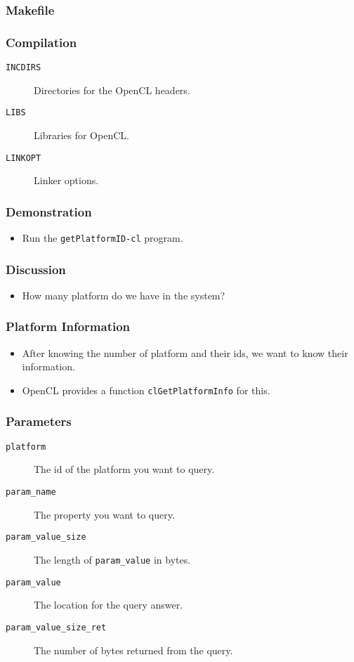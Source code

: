 \documentclass{beamer}
\begin{document}
\begin{frame}
  \frametitle{Makefile}
\end{frame}

\begin{frame}
  \frametitle{Compilation}
  \begin{description}
  \item [\tt INCDIRS] Directories for the OpenCL headers.
  \item [\tt LIBS] Libraries for OpenCL.
  \item [\tt LINKOPT] Linker options.
  \end{description}
\end{frame}

\begin{frame}
  \frametitle{Demonstration}
  \begin{itemize}
  \item Run the {\tt getPlatformID-cl} program.
  \end{itemize}
\end{frame}

\begin{frame}
  \frametitle{Discussion}
  \begin{itemize}
  \item How many platform do we have in the system?
  \end{itemize}
\end{frame}

\begin{frame}
  \frametitle{Platform Information}
  \begin{itemize}
    \item After knowing the number of platform and their ids, we want
      to know their information.
    \item OpenCL provides a function {\tt clGetPlatformInfo} for this.
  \end{itemize}
\end{frame}

\begin{frame}
\end{frame}

\begin{frame}
  \frametitle{Parameters}
  \begin{description}
  \item [\tt platform] The id of the platform you want to query.
  \item [\tt param\_name] The property you want to query.
  \item [\tt param\_value\_size] The length of {\tt param\_value} in
    bytes.
  \item [\tt param\_value] The location for the query answer.
  \item [\tt param\_value\_size\_ret] The number of bytes returned
    from the query.
  \end{description}
\end{frame}
\end{document}

